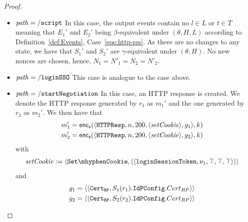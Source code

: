 \begin{theorem}
\begin{proof}
    \begin{itemize}
      \item $\mathit{path} = \mathtt{/script}$ In this case, 
        the output events contain no $l\in L$ or $t\in T$ 
        meaning that $E_1'$ and $E_2'$ being $\beta$-equivalent
        under $(\theta,H,L)$ according to 
        Definition~\ref{def:Events}, Case~\ref{eqe:http-res}. As
        there are no changes to any state, we have that $S_1'$ 
        and $S_2'$ are $\gamma$-equivalent under $(\theta,H)$. 
        No new nonces are chosen, hence, 
        $N_1 = N'_1 = N_2 = N'_2$.
      \item $\mathit{path} = \mathtt{/loginSSO}$ This case is analogue
        to the case above.
      \item $\mathit{path} = \mathtt{/startNegotiation}$ In this case, 
        an HTTP response is created. We denote the HTTP response generated by $r_1$ as $m_1'$ and the one
        generated by $r_2$ as $m_2'$. We then have that
        \begin{align*}
          m_1' = \mathsf{enc}_\mathsf{s}(\langle\mathtt{HTTPResp},n,200,\langle\mathit{setCookie}\rangle,g_1\rangle,k) \\
          m_2' = \mathsf{enc}_\mathsf{s}(\langle\mathtt{HTTPResp},n,200,\langle\mathit{setCookie}\rangle,g_2\rangle,k)
        \end{align*}
        with
        \begin{align*}
          \mi{setCookie} := \myangle{\cSetCookie, \myangle{\myangle{\str{loginSessionToken}, \nu_1, \True, \True, \True}}} \\
        \end{align*}
        and 
        \begin{align*}
          g_1 = \langle\langle\mathtt{Cert_{RP}},S_1(r_1).\mathtt{IdPConfig}.Cert_{RP}\rangle\rangle \\
          g_2 = \langle\langle\mathtt{Cert_{RP}},S_2(r_2).\mathtt{IdPConfig}.Cert_{RP}\rangle\rangle
        \end{align*}
  

\end{itemize}
\end{proof}
\end{theorem}
